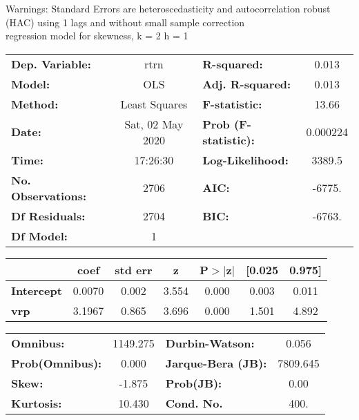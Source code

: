 Warnings: \newline
 [1] Standard Errors are heteroscedasticity and autocorrelation robust (HAC) using 1 lags and without small sample correction\\ 

regression model for skewness, k = 2 h = 1\begin{center}
\begin{tabular}{lclc}
\toprule
\textbf{Dep. Variable:}    &       rtrn       & \textbf{  R-squared:         } &     0.013   \\
\textbf{Model:}            &       OLS        & \textbf{  Adj. R-squared:    } &     0.013   \\
\textbf{Method:}           &  Least Squares   & \textbf{  F-statistic:       } &     13.66   \\
\textbf{Date:}             & Sat, 02 May 2020 & \textbf{  Prob (F-statistic):} &  0.000224   \\
\textbf{Time:}             &     17:26:30     & \textbf{  Log-Likelihood:    } &    3389.5   \\
\textbf{No. Observations:} &        2706      & \textbf{  AIC:               } &    -6775.   \\
\textbf{Df Residuals:}     &        2704      & \textbf{  BIC:               } &    -6763.   \\
\textbf{Df Model:}         &           1      & \textbf{                     } &             \\
\bottomrule
\end{tabular}
\begin{tabular}{lcccccc}
                   & \textbf{coef} & \textbf{std err} & \textbf{z} & \textbf{P$> |$z$|$} & \textbf{[0.025} & \textbf{0.975]}  \\
\midrule
\textbf{Intercept} &       0.0070  &        0.002     &     3.554  &         0.000        &        0.003    &        0.011     \\
\textbf{vrp}       &       3.1967  &        0.865     &     3.696  &         0.000        &        1.501    &        4.892     \\
\bottomrule
\end{tabular}
\begin{tabular}{lclc}
\textbf{Omnibus:}       & 1149.275 & \textbf{  Durbin-Watson:     } &    0.056  \\
\textbf{Prob(Omnibus):} &   0.000  & \textbf{  Jarque-Bera (JB):  } & 7809.645  \\
\textbf{Skew:}          &  -1.875  & \textbf{  Prob(JB):          } &     0.00  \\
\textbf{Kurtosis:}      &  10.430  & \textbf{  Cond. No.          } &     400.  \\
\bottomrule
\end{tabular}
\end{center}

